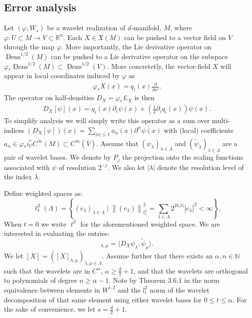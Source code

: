 \documentclass[12pt]{amsart}
\newcommand{\abs}[1]{\left| #1 \right|}
\newcommand{\norm}[1]{\left\| #1 \right\|}
\newcommand{\card}[1]{\left| #1 \right|}
\newcommand{\N}{\mathbb{N}}
\renewcommand{\phi}{\varphi}
\DeclareMathOperator{\Dens}{Dens}
\begin{document}
\subsection{Error analysis}
\label{sec:error}
Let $(\phi,W_s)$ be a wavelet realization of $d$-manifold, $M$,
where $\phi: U \subset M \to V \subset \mathbb{R}^n$.
Each $X \in \mathfrak{X}(M)$ can be pushed to a vector field on $V$ through the map $\phi$.
More importantly, the Lie derivative operator on $\Dens^{1/2}(M)$ can be pushed to a Lie derivative operator on the subspace $\phi_* \Dens^{1/2}(M) \subset \Dens^{1/2}(V)$.
More concretetly, the vector-field $X$ will appear in local coordinates induced by $\phi$ as
\begin{align*}
  \phi_*X(x) = q_i(x) \frac{\partial}{\partial x^i}.
\end{align*}
The operator on half-densities $D_X = \phi_* \pounds_X$ is then
\begin{align*}
  D_X[\psi](x) =  q_i(x) \partial_i \psi(x) + \left( \frac{1}{2} \partial_i q_i(x) \right) \psi(x).
\end{align*}
 To simplify analysis we will simply write this operator as a sum over multi-indices $(D_X [\psi] )(x) = \sum_{|\alpha|\leq 1} a_\alpha(x) \partial^\alpha \psi(x)$ with (local) coefficients $a_\alpha \in \phi_*i_{U}^*C^{\infty}(M) \subset C^{\infty}(\bar{V})$. Assume that $(\psi_\lambda)_{\lambda \in \Lambda}$ and $(\tilde{\psi}_\lambda)_{\lambda \in \Lambda}$ are a pair of wavelet bases. We denote by $P_j$ the projection onto the scaling functions associated with $\psi$ of resolution $2^{-j}$. We also let $\card{\lambda}$ denote the resolution level of the index $\lambda$. 

Define weighted spaces as:
\begin{equation}
	\ell_t^2(\Lambda) = \left\{ (c_\lambda)_{\lambda \in \Lambda}  \mid \norm{(c_\lambda)}_{\ell^2_t}^2 = \sum_{\lambda \in \Lambda} 2^{2t\card{\lambda}}\abs{c_\lambda}^2 < \infty  \right\}.
\end{equation}
When $t = 0$ we write $\ell^2$ for the aforementioned weighted space. We are interested in evaluating the entries:
\begin{equation}
	[X]_{\lambda,\mu} = \langle D_X \psi_\lambda, \tilde{\psi}_\mu \rangle.
\end{equation}
We let $[X]=([X]_{\lambda,\mu})_{\lambda,\mu \in \Lambda}$. Assume further that there exists an $\alpha,n \in \N$ such that the wavelets are in $C^{\alpha}$, $\alpha \geq \frac{d}{2} + 1$, and that the wavelets are orthogonal to polynomials of degree $n \geq \alpha - 1$.  Note by Theorem 3.6.1 in \cite{Cohen2003} the norm equivalence between elements in $W^{t,2}$ and the $l_t^2$ norm of the wavelet decomposition of that same element using either wavelet bases for $0\leq t \leq \alpha$. For the sake of convenience, we let $s = \frac{d}{2} + 1$. 
\end{document}

